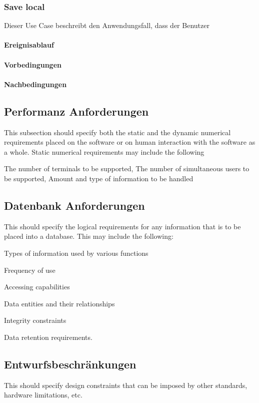 		\subsubsection{Save local}
			Dieser Use Case beschreibt den Anwendungsfall, dass der Benutzer 
			
			\paragraph{Ereignisablauf}
	
			\paragraph{Vorbedingungen}
			
			\paragraph{Nachbedingungen}
	
	\subsection{Performanz Anforderungen}
		This subsection should specify both the static and the dynamic numerical requirements placed on the software or on human interaction with the software as a whole. Static numerical requirements may include the following
		
		The number of terminals to be supported, The number of simultaneous users to be supported, Amount and type of information to be handled
		
	\subsection{Datenbank Anforderungen}
		This should specify the logical requirements for any information that is to be placed into a database. This may include the following:
		
		Types of information used by various functions
		
		Frequency of use
		
		Accessing capabilities
		
		Data entities and their relationships
		
		Integrity constraints
		
		Data retention requirements.
	
	\subsection{Entwurfsbeschränkungen}
		This should specify design constraints that can be imposed by other standards, hardware limitations, etc.
		
